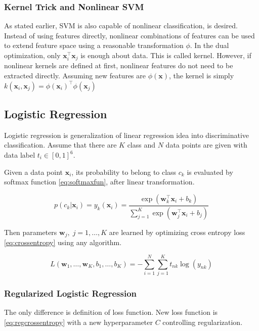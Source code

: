 \subsubsection{Kernel Trick and Nonlinear SVM}
As stated earlier, SVM is also capable of nonlinear classification, is desired. Instead of using features directly, nonlinear combinations of features can be used to extend feature space using a reasonable transformation $\phi$. In the dual optimization, only $\boldsymbol{x}_i^\intercal\boldsymbol{x}_j$ is enough about data. This is called kernel. However, if nonlinear kernels are defined at first, nonlinear features do not need to be extracted directly. 
Assuming new features are  $\phi(\boldsymbol{x})$, the kernel is simply $k(\boldsymbol{x}_i,\boldsymbol{x}_j)=\phi(\boldsymbol{x}_i)^\intercal\phi(\boldsymbol{x}_j)$

\subsection{Logistic Regression}
Logistic regression is generalization of linear regression idea into discriminative classification. Assume that there are $K$ class and $N$ data points are given with data label $t_i \in [0,1]^6$.

Given a data point $\boldsymbol{x}_i$, its probability to belong to class $c_k$ is evaluated by softmax function \ref{eq:softmaxfun}, after linear transformation.

\begin{equation}
\label{eq:softmaxfun}
p(c_k|\boldsymbol{x}_i) = y_k(\boldsymbol{x}_i) = \frac{\exp(\boldsymbol{w}_k^\intercal\boldsymbol{x}_i+b_k)}{\sum_{j=1}^{K} \exp(\boldsymbol{w}_j^\intercal\boldsymbol{x}_i+b_j)}
\end{equation} 

Then parameters $\boldsymbol{w}_j, \; j=1,\ldots,K$ are learned by optimizing cross entropy loss \ref{eq:crossentropy} using any algorithm.

\begin{equation}
\label{eq:crossentropy}
L(\boldsymbol{w}_1,\ldots,\boldsymbol{w}_K,b_1,\ldots,b_K) = -\sum_{i=1}^{N}\sum_{j=1}^{K} t_{nk} \log(y_{nk})
\end{equation} 

\subsubsection{Regularized Logistic Regression}

The only difference is definition of loss function. New loss function is \ref{eq:regcrossentropy} with a new hyperparameter $C$ controlling regularization.

